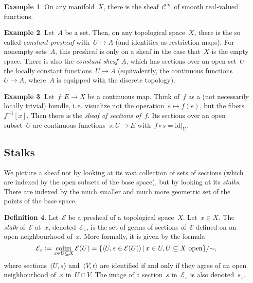 \documentclass[10pt]{amsart}
\makeatletter
\theoremstyle{definition}
\newtheorem{defn}{Definition}[section]
\newtheorem{ex}[defn]{Example}
\theoremstyle{plain}
\theoremstyle{remark}
\newcommand{\C}{\mathcal{C}}
\newcommand{\E}{\mathcal{E}}
\newcommand{\defeq}{\vcentcolon=}
\DeclareMathOperator{\colim}{colim}
\newcommand{\ie}{i.\,e.\@\xspace}
\newcommand{\id}{\mathrm{id}}
\makeatother
\begin{document}
\begin{ex}On any manifold~$X$, there is the sheaf~$\C^\infty$ of smooth
real-valued functions.
\end{ex}

\begin{ex}Let~$A$ be a set. Then, on any topological space~$X$, there is the
so called \emph{constant presheaf} with~$U \mapsto A$ (and identities as
restriction maps). For nonempty sets~$A$, this presheaf is only on a sheaf in
the case that~$X$ is the empty space. There is also the \emph{constant
sheaf}~$\underline{A}$, which has sections over an open set~$U$ the locally
constant functions~$U \to A$ (equivalently, the continuous functions~$U \to A$,
where~$A$ is equipped with the discrete topology).\end{ex}

\begin{ex}\label{ex:sheaf-of-sections}
Let~$f : E \to X$ be a continuous map. Think of~$f$ as a (not
necessarily locally trivial) bundle, \ie visualize not the operation~$e \mapsto
f(e)$, but the fibers~$f^{-1}[x]$. Then there is the \emph{sheaf of sections
of~$f$}. Its sections over an open subset~$U$ are continuous functions~$s : U
\to E$ with~$f \circ s = \id|_U$.\end{ex}


\subsection{Stalks}

We picture a sheaf not by looking at its vast collection of sets of sections
(which are indexed by the open subsets of the base space), but by looking at
its \emph{stalks}. There are indexed by the much smaller and much more
geometric set of the points of the base space.

\begin{defn}Let~$\E$ be a presheaf of a topological space~$X$. Let~$x \in X$.
The \emph{stalk} of~$\E$ at~$x$, denoted~$\E_x$, is the set of germs of
sections of~$\E$ defined on an open neighbourhood of~$x$. More formally, it is
given by the formula
\[ \E_x \defeq
  \colim_{x \in U \subseteq X} \E(U) =
  \{ \langle U, s \in \E(U) \rangle \,|\, x \in U,
    \text{$U \subseteq X$ open} \}/{\sim}, \]
where sections~$\langle U,s \rangle$ and~$\langle V,t \rangle$ are identified
if and only if they agree of an open neighbourhood of~$x$ in~$U \cap
V$. The image of a section~$s$ in~$\E_x$ is also denoted~$s_x$.\end{defn}
\end{document}
